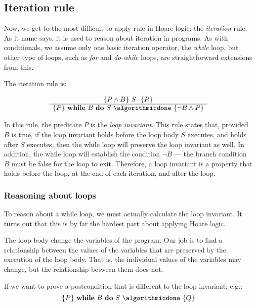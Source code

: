 \subsection{Iteration rule}

Now, we get to the most difficult-to-apply rule in Hoare logic: the {\em iteration} rule. As it name says, it is used to reason about iteration in programs. As with conditionals, we assume only one basic iteration operator, the {\em while} loop, but other type of loops, such as \emph{for} and \emph{do-while} loops, are straightforward extensions from this.

The iteration rule is:

\begin{displaymath}
 \begin{array}{c}
  \{P \land B\} ~S~~\{P\}  \\
 \hline
 \{P\}~ \algorithmicwhile~ B ~\algorithmicdo~ S ~ \algorithmicdone~\{\neg B \land P\}
 \end{array}
\end{displaymath}

In this rule, the predicate $P$ is the \emph{loop invariant}. This rule states that, provided $B$ is true, if the loop invariant holds before the loop body $S$ executes, and holds after $S$ executes, then the while loop will preserve the loop invariant as well. In addition, the while loop will establish the condition $\neg B$ --- the branch condition $B$ must be false for the loop to exit. Therefore, a loop invariant is a property that holds before the loop, at the end of each iteration, and after the loop.

\subsubsection*{Reasoning about loops}

To reason about a while loop, we must actually calculate the loop invariant. It turns out that this is by far the hardest part about applying Hoare logic.

The loop body change the variables of the program. Our job is to find a relationship between the values of the variables that are preserved by the execution of the loop body. That is, the individual values of the variables may change, but the relationship between them does not. 

If we want to prove a postcondition that is different to the loop invariant; e.g.:
\begin{displaymath}
\{P\}~ \algorithmicwhile~ B ~\algorithmicdo~ S ~ \algorithmicdone~\{Q\}
\end{displaymath}

